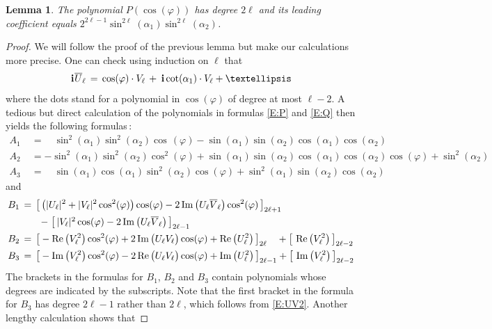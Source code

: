 \documentclass[11pt,reqno]{amsart}
\newtheorem{lemma}[theorem]{Lemma}
\theoremstyle{definition}
\renewcommand{\phi}{\varphi}
\renewcommand{\i}{\mspace{1.5mu}\mathbf i}
\renewcommand{\Re}{\operatorname{Re}}
\renewcommand{\Im}{\operatorname{Im}}
\begin{document}
\begin{sloppypar}
\begin{lemma}\label{L:two}
The polynomial $P(\cos(\phi))$ has degree $2\ell$ and its leading coefficient equals $2^{2\ell -1} \sin^{2\ell} (\alpha_1) \sin^{2\ell}(\alpha_2)$.
\end{lemma}

\begin{proof}
We will follow the proof of the previous lemma but make our calculations more precise. One can check using induction on $\ell$ that
\begin{equation}\label{E:UV2}
\i\mspace{1mu} \overline U_{\ell}\, = \, \cos(\phi) \cdot V_{\ell}\, +\, \i \cot(\alpha_1)\cdot V_{\ell} + \ldots
\end{equation}
where the dots stand for a polynomial in $\cos(\phi)$ of degree at most $\ell - 2$. A tedious but direct calculation of the polynomials in formulas \eqref{E:P} and \eqref{E:Q} then yields the following formulas\,:
\begin{align*}
A_1\; & = \quad \sin^2(\alpha_1) \sin^2(\alpha_2) \cos\,(\phi) - \sin(\alpha_1)\sin(\alpha_2)\cos(\alpha_1)\cos(\alpha_2)\\
A_2\; & = - \sin^2(\alpha_1) \sin^2(\alpha_2) \cos^2(\phi) + \sin(\alpha_1)\sin(\alpha_2)\cos(\alpha_1)\cos(\alpha_2)\cos(\phi) + \sin^2(\alpha_2) \\
A_3\; & = \quad \sin(\alpha_1) \cos(\alpha_1) \sin^2(\alpha_2)\cos(\phi) + \sin^2(\alpha_1)\sin(\alpha_2)\cos(\alpha_2) 
\end{align*}
and 
\begin{align*}
B_1\, & =\, \big[\,\big(|U_{\ell}|^2 + |V_{\ell}|^2 \cos^2(\phi)\big)\cos(\phi) - 2\Im \big(U_{\ell} \overline V_{\ell}\big) \cos^2(\phi)\,\big]_{2 \ell + 1} \\ & \tag*{$-\;\big[\, |V_{\ell}|^2 \cos(\phi) - 2\Im \big(U_{\ell} \overline V_{\ell}\big)\, \big]_{2\ell - 1}$\qquad} \\
B_2\, & =\, \big[- \Re \big(V_{\ell}^2\big)\cos^2(\phi) + 2\Im \big(U_{\ell} V_{\ell}\big) \cos(\phi) +  \Re \big(U_{\ell}^2\big)\,\big]_{2 \ell}\quad + \big[\,\Re \big(V_{\ell}^2\big)\,\big]_{2\ell - 2}\\
B_3\, & =\, \big[- \Im \big(V_{\ell}^2\big) \cos^2 (\phi) - 2 \Re \big (U_{\ell}V_{\ell}\big)\cos(\phi) +  \Im \big(U_{\ell}^2\big)\,\big]_{2\ell - 1} + \big[\,\Im \big(V_{\ell}^2\big)\,\big]_{2\ell - 2}
\end{align*}
The brackets in the formulas for $B_1$, $B_2$ and $B_3$ contain polynomials whose degrees are indicated by the subscripts. Note that the first bracket in the formula for $B_3$ has degree $2\ell - 1$ rather than $2\ell$, which follows from \eqref{E:UV2}. Another lengthy calculation shows that

\end{proof}
\end{sloppypar}
\end{document}
